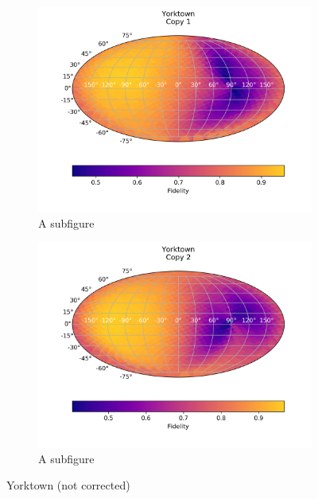 \begin{figure}[H]
    \centering
    \begin{subfigure}{.5\textwidth}
      \centering
      \includegraphics[width=\textwidth]{Figures/Economical/IBM/FullSphere/results_ibmqx2_copy1.png}
      \caption{A subfigure}
      \label{fig:ec_yorktown_sphere_1}
    \end{subfigure}%
    \begin{subfigure}{.5\textwidth}
      \centering
      \includegraphics[width=\textwidth]{Figures/Economical/IBM/FullSphere/results_ibmqx2_copy2.png}
      \caption{A subfigure}
      \label{fig:ec_yorktown_sphere_2}
    \end{subfigure}
    \caption{Yorktown (not corrected)}
    \label{fig:ec_yorktown_sphere}
\end{figure}

